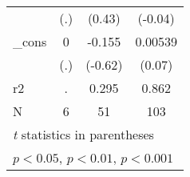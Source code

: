 \begin{table}[htbp]
\begin{tabular}{l*{3}{c}}
            &         (.)         &      (0.43)         &     (-0.04)         \\
[1em]
\_cons      &           0         &      -0.155         &     0.00539         \\
            &         (.)         &     (-0.62)         &      (0.07)         \\
\hline
r2          &           .         &       0.295         &       0.862         \\
N           &           6         &          51         &         103         \\
\hline\hline
\multicolumn{4}{l}{\footnotesize \textit{t} statistics in parentheses}\\
\multicolumn{4}{l}{\footnotesize \sym{*} \(p<0.05\), \sym{**} \(p<0.01\), \sym{***} \(p<0.001\)}\\
\end{tabular}
\end{table}
